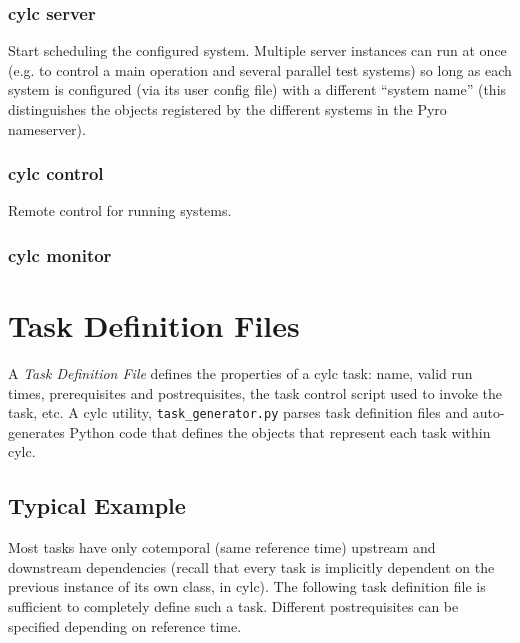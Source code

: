 \documentclass[11pt,a4paper]{article}
\begin{document}
\pagebreak
\subsubsection{cylc server}

Start scheduling the configured system. Multiple server instances can run at once
(e.g. to control a main operation and several parallel test systems) so
long as each system is configured (via its user config file) with a
different ``system name'' (this distinguishes the objects registered by
the different systems in the Pyro nameserver).

{
\color{Magenta}

}



\pagebreak
\subsubsection{cylc control}

Remote control for running systems.

{
\color{Magenta}

}



\pagebreak
\subsubsection{cylc monitor}
{
\color{Magenta}

}

\label{config}

\pagebreak
\section{Task Definition Files}

A {\em Task Definition File} defines the properties of a cylc task:
name, valid run times, prerequisites and postrequisites, the task
control script used to invoke the task, etc.  A cylc utility,
\verb=task_generator.py= parses task definition files and auto-generates
Python code that defines the objects that represent each task within
cylc.

\subsection{Typical Example}

Most tasks have only cotemporal (same reference time) upstream and
downstream dependencies (recall that every task is implicitly dependent
on the previous instance of its own class, in cylc). The following
task definition file is sufficient to completely define such a task.
Different postrequisites can be specified depending on reference time. 
\end{document}
